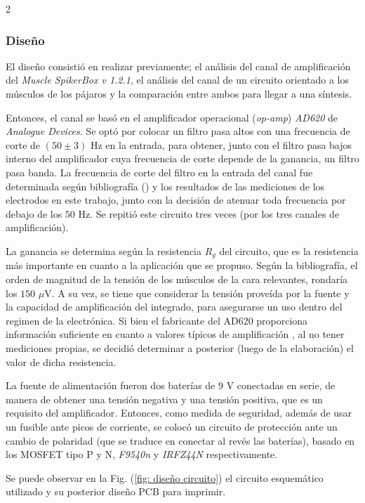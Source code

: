 \documentclass[11pt,letterpaper]{article}
\begin{document}
\begin{multicols*}{2}
\subsubsection{Diseño}
El diseño consistió en realizar previamente; el análisis del canal de amplificación del \textit{Muscle SpikerBox v 1.2.1}, el análisis del canal de un circuito orientado a los músculos de los pájaros \cite{datasheet_labo7} y la comparación entre ambos para llegar a una síntesis.

Entonces, el canal se basó en el amplificador operacional (\textit{op-amp}) \textit{AD620} de \textit{Analogue Devices}. Se optó por colocar un filtro pasa altos con una frecuencia de corte de $(50 \pm 3)$ Hz en la entrada, para obtener, junto con el filtro pasa bajos interno del amplificador cuya frecuencia de corte depende de la ganancia, un filtro pasa banda. La frecuencia de corte del filtro en la entrada del canal fue determinada según bibliografía (\textcite{ratnovsky2021}) y los resultados de las mediciones de los electrodos en este trabajo, junto con la decisión de atenuar toda frecuencia por debajo de los $50$ Hz. Se repitió este circuito tres veces (por los tres canales de amplificación).

La ganancia se determina según la resistencia $R_g$ del circuito, que es la resistencia más importante en cuanto a la aplicación que se propuso. Según la bibliografía, el orden de magnitud de la tensión de los músculos de la cara relevantes, rondaría los $150$ $\mu$V. A su vez, se tiene que considerar la tensión proveída por la fuente y la capacidad de amplificación del integrado, para asegurarse un uso dentro del regimen  de la electrónica. Si bien el fabricante del AD620 proporciona información suficiente en cuanto a valores típicos de amplificación \cite{ad620}, al no tener mediciones propias, se decidió determinar a posterior (luego de la elaboración) el valor de dicha resistencia.

La fuente de alimentación fueron dos baterías de $9$ V conectadas en serie, de manera de obtener una tensión negativa y una tensión positiva, que es un requisito del amplificador. Entonces, como medida de seguridad, además de usar un fusible ante picos de corriente, se colocó un circuito de protección ante un cambio de polaridad (que se traduce en conectar al revés las baterías), basado en los MOSFET tipo P y N, \textit{F9540n} y \textit{IRFZ44N} respectivamente.

Se puede observar en la Fig. (\ref{fig: diseño circuito}) el circuito esquemático utilizado y su posterior diseño PCB para imprimir.


\end{multicols*}
\end{document}
